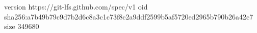 version https://git-lfs.github.com/spec/v1
oid sha256:a7b49b79c9d7b2d6c8a3c1c73f8c2a9ddf2599b5af5720ed2965b790b26a42c7
size 349680
